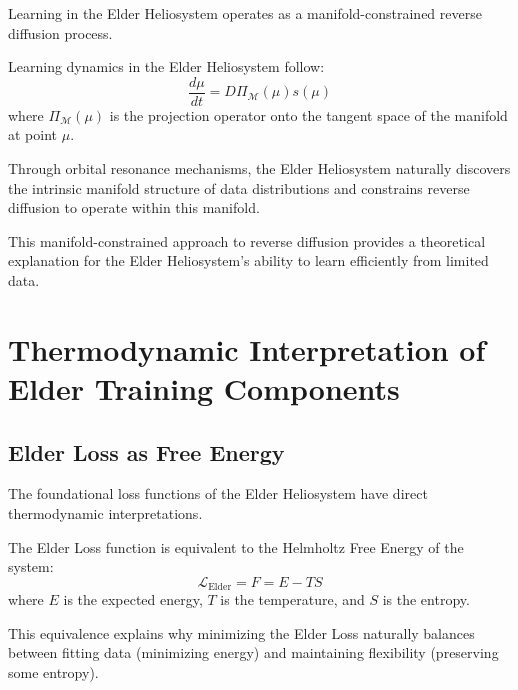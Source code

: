 Learning in the Elder Heliosystem operates as a manifold-constrained reverse diffusion process.

\begin{definition}
Learning dynamics in the Elder Heliosystem follow:
\begin{equation}
\frac{d\mu}{dt} = D \Pi_{\mathcal{M}}(\mu) s(\mu)
\end{equation}
where $\Pi_{\mathcal{M}}(\mu)$ is the projection operator onto the tangent space of the manifold at point $\mu$.
\end{definition}

\begin{theorem}
Through orbital resonance mechanisms, the Elder Heliosystem naturally discovers the intrinsic manifold structure of data distributions and constrains reverse diffusion to operate within this manifold.
\end{theorem}

This manifold-constrained approach to reverse diffusion provides a theoretical explanation for the Elder Heliosystem's ability to learn efficiently from limited data.

\section{Thermodynamic Interpretation of Elder Training Components}

\subsection{Elder Loss as Free Energy}

The foundational loss functions of the Elder Heliosystem have direct thermodynamic interpretations.

\begin{theorem}
The Elder Loss function is equivalent to the Helmholtz Free Energy of the system:
\begin{equation}
\mathcal{L}_{\text{Elder}} = F = E - TS
\end{equation}
where $E$ is the expected energy, $T$ is the temperature, and $S$ is the entropy.
\end{theorem}

This equivalence explains why minimizing the Elder Loss naturally balances between fitting data (minimizing energy) and maintaining flexibility (preserving some entropy).

